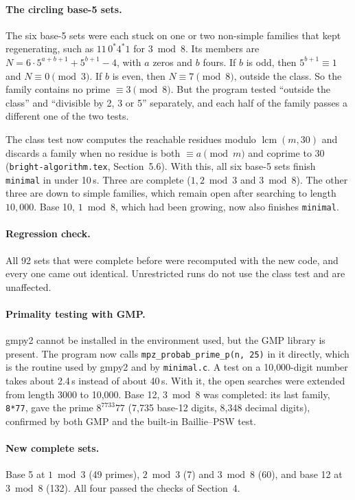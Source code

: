 \documentclass[11pt]{article}
\newcommand{\code}[1]{\texttt{#1}}
\begin{document}
\paragraph{The circling base-5 sets.} The six base-5 sets were each stuck on one or two non-simple families that kept regenerating, such as $11\,0^*4^*1$ for $3 \bmod 8$. Its members are $N=6\cdot5^{a+b+1}+5^{b+1}-4$, with $a$ zeros and $b$ fours. If $b$ is odd, then $5^{b+1}\equiv 1$ and $N\equiv 0 \pmod 3$. If $b$ is even, then $N\equiv 7 \pmod 8$, outside the class. So the family contains no prime $\equiv 3 \pmod 8$. But the program tested ``outside the class'' and ``divisible by 2, 3 or 5'' separately, and each half of the family passes a different one of the two tests.

The class test now computes the reachable residues modulo $\operatorname{lcm}(m,30)$ and discards a family when no residue is both $\equiv a \pmod m$ and coprime to $30$ (\code{bright-algorithm.tex}, Section~5.6). With this, all six base-5 sets finish \code{minimal} in under 10\,s. Three are complete ($1, 2 \bmod 3$ and $3 \bmod 8$). The other three are down to simple families, which remain open after searching to length $10{,}000$. Base 10, $1 \bmod 8$, which had been growing, now also finishes \code{minimal}.

\paragraph{Regression check.} All 92 sets that were complete before were recomputed with the new code, and every one came out identical. Unrestricted runs do not use the class test and are unaffected.

\paragraph{Primality testing with GMP.} gmpy2 cannot be installed in the environment used, but the GMP library is present. The program now calls \code{mpz\_probab\_prime\_p(n, 25)} in it directly, which is the routine used by gmpy2 and by \code{minimal.c}. A test on a 10{,}000-digit number takes about 2.4\,s instead of about 40\,s. With it, the open searches were extended from length 3000 to 10{,}000. Base 12, $3 \bmod 8$ was completed: its last family, \code{8*77}, gave the prime $8^{7733}77$ (7{,}735 base-12 digits, 8{,}348 decimal digits), confirmed by both GMP and the built-in Baillie--PSW test.

\paragraph{New complete sets.} Base 5 at $1 \bmod 3$ (49 primes), $2 \bmod 3$ (7) and $3 \bmod 8$ (60), and base 12 at $3 \bmod 8$ (132). All four passed the checks of Section~4.
\end{document}
